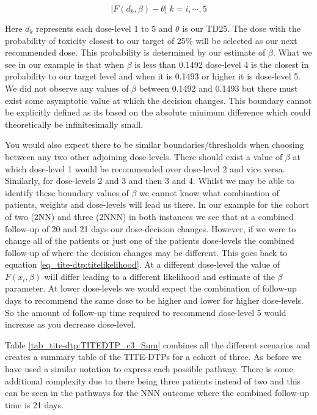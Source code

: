 \begin{equation}
	|F(d_k, \beta) - \theta| \; k = i, \cdots, 5
\end{equation}

Here $d_k$ represents each dose-level 1 to 5 and $\theta$ is our TD25. The dose with the probability of toxicity closest to our target of 25\% will be selected as our next recommended dose. This probability is determined by our estimate of $\beta$. What we see in our example is that when $\beta$ is less than 0.1492 dose-level 4 is the closest in probability to our target level and when it is 0.1493 or higher it is dose-level 5. We did not observe any values of $\beta$ between 0.1492 and 0.1493 but there must exist some asymptotic value at which the decision changes. This boundary cannot be explicitly defined as its based on the absolute minimum difference which could theoretically be infinitesimally small.    

You would also expect there to be similar boundaries/thresholds when choosing between any two other adjoining dose-levels. There should exist a value of $\beta$ at which dose-level 1 would be recommended over dose-level 2 and vice versa. Similarly, for dose-levels 2 and 3 and then 3 and 4. Whilst we may be able to identify these boundary values of $\beta$ we cannot know what combination of patients, weights and dose-levels will lead us there. In our example for the cohort of two (2NN) and three (2NNN) in both instances we see that at a combined follow-up of 20 and 21 days our dose-decision changes. However, if we were to change all of the patients or just one of the patients dose-levels the combined follow-up of where the decision changes may be different. This goes back to equation \ref{eq_tite-dtp:titelikelihood}. At a different dose-level the value of $F(x_i, \beta)$ will differ leading to a different likelihood and estimate of the $\beta$ parameter. At lower dose-levels we would expect the combination of follow-up days to recommend the same dose to be higher and lower for higher dose-levels. So the amount of follow-up time required to recommend dose-level 5 would increase as you decrease dose-level. 

Table \ref{tab_tite-dtp:TITEDTP_c3_Sum} combines all the different scenarios and creates a summary table of the TITE-DTPs for a cohort of three. As before we have used a similar notation to express each possible pathway. There is some additional complexity due to there being three patients instead of two and this can be seen in the pathways for the NNN outcome where the combined follow-up time is 21 days.

